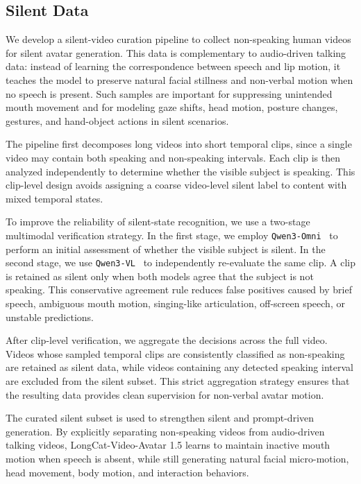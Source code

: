 \subsection{Silent Data}
We develop a silent-video curation pipeline to collect non-speaking human videos for silent avatar generation. This data is complementary to audio-driven talking data: instead of learning the correspondence between speech and lip motion, it teaches the model to preserve natural facial stillness and non-verbal motion when no speech is present. Such samples are important for suppressing unintended mouth movement and for modeling gaze shifts, head motion, posture changes, gestures, and hand-object actions in silent scenarios.

The pipeline first decomposes long videos into short temporal clips, since a single video may contain both speaking and non-speaking intervals. Each clip is then analyzed independently to determine whether the visible subject is speaking. This clip-level design avoids assigning a coarse video-level silent label to content with mixed temporal states.

To improve the reliability of silent-state recognition, we use a two-stage multimodal verification strategy. In the first stage, we employ \texttt{Qwen3-Omni}~\cite{xu2025qwen3} to perform an initial assessment of whether the visible subject is silent. In the second stage, we use \texttt{Qwen3-VL}~\cite{Qwen3-VL} to independently re-evaluate the same clip. A clip is retained as silent only when both models agree that the subject is not speaking. This conservative agreement rule reduces false positives caused by brief speech, ambiguous mouth motion, singing-like articulation, off-screen speech, or unstable predictions.

After clip-level verification, we aggregate the decisions across the full video. Videos whose sampled temporal clips are consistently classified as non-speaking are retained as silent data, while videos containing any detected speaking interval are excluded from the silent subset. This strict aggregation strategy ensures that the resulting data provides clean supervision for non-verbal avatar motion.

The curated silent subset is used to strengthen silent and prompt-driven generation. By explicitly separating non-speaking videos from audio-driven talking videos, LongCat-Video-Avatar 1.5 learns to maintain inactive mouth motion when speech is absent, while still generating natural facial micro-motion, head movement, body motion, and interaction behaviors.


